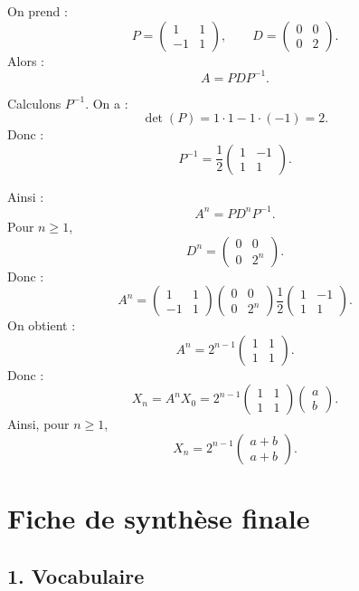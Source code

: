 \documentclass[11pt,a4paper]{article}
\begin{document}
On prend :
\[
P=
\begin{pmatrix}
1&1\\
-1&1
\end{pmatrix},
\qquad
D=
\begin{pmatrix}
0&0\\
0&2
\end{pmatrix}.
\]
Alors :
\[
A=PDP^{-1}.
\]

Calculons \(P^{-1}\).  
On a :
\[
\det(P)=1\cdot1-1\cdot(-1)=2.
\]
Donc :
\[
P^{-1}
=
\frac12
\begin{pmatrix}
1&-1\\
1&1
\end{pmatrix}.
\]

Ainsi :
\[
A^n=PD^nP^{-1}.
\]
Pour \(n\geq1\),
\[
D^n=
\begin{pmatrix}
0&0\\
0&2^n
\end{pmatrix}.
\]
Donc :
\[
A^n
=
\begin{pmatrix}
1&1\\
-1&1
\end{pmatrix}
\begin{pmatrix}
0&0\\
0&2^n
\end{pmatrix}
\frac12
\begin{pmatrix}
1&-1\\
1&1
\end{pmatrix}.
\]
On obtient :
\[
A^n
=
2^{n-1}
\begin{pmatrix}
1&1\\
1&1
\end{pmatrix}.
\]
Donc :
\[
X_n=A^nX_0
=
2^{n-1}
\begin{pmatrix}
1&1\\
1&1
\end{pmatrix}
\begin{pmatrix}
a\\b
\end{pmatrix}.
\]
Ainsi, pour \(n\geq1\),
\[
X_n=
2^{n-1}
\begin{pmatrix}
a+b\\
a+b
\end{pmatrix}.
\]

\newpage
\section{Fiche de synthèse finale}

\subsection*{1. Vocabulaire}
\end{document}
